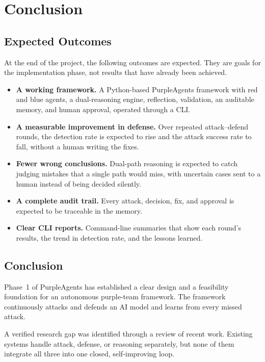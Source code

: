 \chapter{Conclusion}
\label{ch:concl}

\section{Expected Outcomes}

At the end of the project, the following outcomes are expected. They are goals
for the implementation phase, not results that have already been achieved.

\begin{itemize}
  \item \textbf{A working framework.} A Python-based PurpleAgents framework with
  red and blue agents, a dual-reasoning engine, reflection, validation, an
  auditable memory, and human approval, operated through a CLI.
  \item \textbf{A measurable improvement in defense.} Over repeated
  attack--defend rounds, the detection rate is expected to rise and the attack
  success rate to fall, without a human writing the fixes.
  \item \textbf{Fewer wrong conclusions.} Dual-path reasoning is expected to
  catch judging mistakes that a single path would miss, with uncertain cases sent
  to a human instead of being decided silently.
  \item \textbf{A complete audit trail.} Every attack, decision, fix, and approval
  is expected to be traceable in the memory.
  \item \textbf{Clear CLI reports.} Command-line summaries that show each
  round's results, the trend in detection rate, and the lessons learned.
\end{itemize}

\section{Conclusion}

Phase~1 of PurpleAgents has established a clear design and a feasibility
foundation for an autonomous purple-team framework. The framework continuously
attacks and defends an AI model and learns from every missed attack.

A verified research gap was identified through a review of recent work. Existing
systems handle attack, defense, or reasoning separately, but none of them
integrate all three into one closed, self-improving loop.

